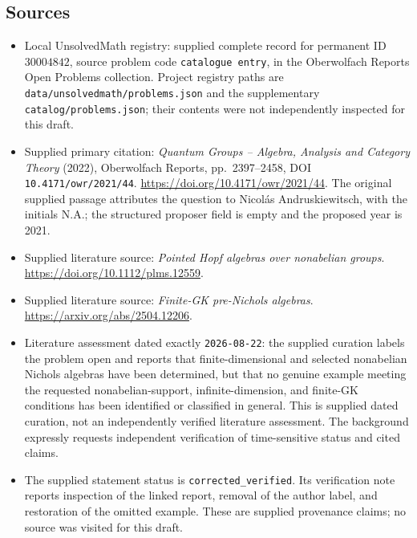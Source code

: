 \documentclass[11pt]{article}
\begin{document}
\subsection{Sources}
\begin{itemize}
\item Local UnsolvedMath registry: supplied complete record for permanent ID \(30004842\), source problem code \texttt{catalogue entry}, in the Oberwolfach Reports Open Problems collection. Project registry paths are \texttt{data/unsolvedmath/problems.json} and the supplementary \texttt{catalog/problems.json}; their contents were not independently inspected for this draft.
\item Supplied primary citation: \emph{Quantum Groups -- Algebra, Analysis and Category Theory} (2022), Oberwolfach Reports, pp.~2397--2458, DOI \texttt{10.4171/owr/2021/44}. \url{https://doi.org/10.4171/owr/2021/44}. The original supplied passage attributes the question to Nicol\'as Andruskiewitsch, with the initials N.A.; the structured proposer field is empty and the proposed year is 2021.
\item Supplied literature source: \emph{Pointed Hopf algebras over nonabelian groups}. \url{https://doi.org/10.1112/plms.12559}.
\item Supplied literature source: \emph{Finite-GK pre-Nichols algebras}. \url{https://arxiv.org/abs/2504.12206}.
\item Literature assessment dated exactly \texttt{2026-08-22}: the supplied curation labels the problem open and reports that finite-dimensional and selected nonabelian Nichols algebras have been determined, but that no genuine example meeting the requested nonabelian-support, infinite-dimension, and finite-GK conditions has been identified or classified in general. This is supplied dated curation, not an independently verified literature assessment. The background expressly requests independent verification of time-sensitive status and cited claims.
\item The supplied statement status is \texttt{corrected\_verified}. Its verification note reports inspection of the linked report, removal of the author label, and restoration of the omitted example. These are supplied provenance claims; no source was visited for this draft.
\end{itemize}
\end{document}
